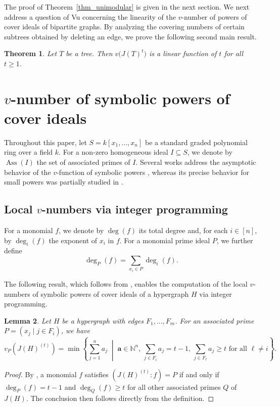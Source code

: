 \documentclass[12pt,amscd]{amsart}
\newtheorem{thm}{Theorem}[section]
\newtheorem{lem}[thm]{Lemma}
\theoremstyle{definition}
\numberwithin{equation}{section}
\begin{document}
The proof of Theorem~\ref{thm_unimodular} is given in the next section. We next address a question of Vu \cite{V} concerning the linearity of the $v$-number of powers of cover ideals of bipartite graphs. By analyzing the covering numbers of certain subtrees obtained by deleting an edge, we prove the following second main result.

\begin{thm}\label{thm_linear_trees}
Let $T$ be a tree. Then $v\bigl(J(T)^t\bigr)$ is a linear function of $t$ for all $t\ge1$.
\end{thm}

\section{$v$-number of symbolic powers of cover ideals}

Throughout this paper, let $S = k[x_1, \ldots, x_n]$ be a standard graded polynomial ring over a field $k$. For a non-zero homogeneous ideal $I \subseteq S$, we denote by $\operatorname{Ass}(I)$ the set of associated primes of $I$. Several works address the asymptotic behavior of the $v$-function of symbolic powers \cite{KNS,VS}, whereas its precise behavior for small powers was partially studied in \cite{CHJV}.

\subsection{Local $v$-numbers via integer programming}

For a monomial $f$, we denote by $\deg(f)$ its total degree and, for each $i \in [n]$, by $\deg_i(f)$ the exponent of $x_i$ in $f$. For a monomial prime ideal $P$, we further define
\[
\deg_P(f) = \sum_{x_i \in P} \deg_i(f).
\]

The following result, which follows from \cite{CHJV}, enables the computation of the local $v$-numbers of symbolic powers of cover ideals of a hypergraph $H$ via integer programming.

\begin{lem}\label{lem_criterion}
Let $H$ be a hypergraph with edges $F_1, \ldots, F_m$. For an associated prime $P = (x_j \mid j \in F_i)$, we have 
\[
v_P(J(H)^{(t)}) = \min \left\{ \sum_{j=1}^n a_j \;\middle|\; \mathbf{a} \in \mathbb{N}^n, \, \sum_{j \in F_i} a_j = t-1, \, \sum_{j \in F_\ell} a_j \ge t \text{ for all } \ell \neq i \right\}.
\]
\end{lem}

\begin{proof}
By \cite[Lemma 2.3]{CHJV}, a monomial $f$ satisfies $(J(H)^{(t)} : f) = P$ if and only if $\deg_P(f) = t-1$ and $\deg_Q(f) \ge t$ for all other associated primes $Q$ of $J(H)$. The conclusion then follows directly from the definition.
\end{proof}
\end{document}
